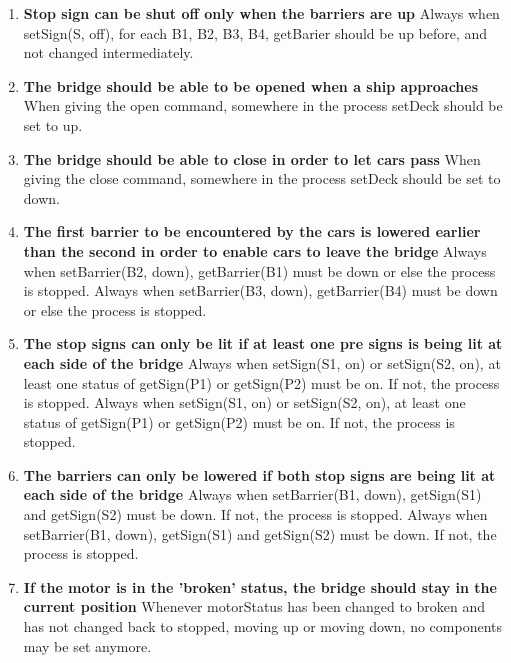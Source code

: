 \begin{enumerate}
	\item \textbf{Stop sign can be shut off only when the barriers are up}
	Always when setSign(S, off), for each B1, B2, B3, B4, getBarier should be up before, and not changed intermediately.

	\item \textbf{The bridge should be able to be opened when a ship approaches}
	When giving the open command, somewhere in the process setDeck should be set to up.

	\item \textbf{The bridge should be able to close in order to let cars pass}
	When giving the close command, somewhere in the process setDeck should be set to down.

	\item \textbf{The first barrier to be encountered by the cars is lowered earlier than the second in order to enable cars to leave the bridge}
	Always when setBarrier(B2, down), getBarrier(B1) must be down or else the process is stopped. 
	Always when setBarrier(B3, down), getBarrier(B4) must be down or else the process is stopped. 

	\item \textbf{The stop signs can only be lit if at least one pre signs is being lit at each side of the bridge}
	Always when setSign(S1, on) or setSign(S2, on), at least one status of getSign(P1) or getSign(P2) must be on. If not, the process is stopped.
	Always when setSign(S1, on) or setSign(S2, on), at least one status of getSign(P1) or getSign(P2) must be on. If not, the process is stopped.

	\item \textbf{The barriers can only be lowered if both stop signs are being lit at each side of the bridge}
	Always when setBarrier(B1, down), getSign(S1) and getSign(S2) must be down. If not, the process is stopped.
	Always when setBarrier(B1, down), getSign(S1) and getSign(S2) must be down. If not, the process is stopped.

	\item \textbf{If the motor is in the 'broken' status, the bridge should stay in the current position}
	Whenever motorStatus has been changed to broken and has not changed back to stopped, moving up or moving down, no components may be set anymore.

\end{enumerate}
